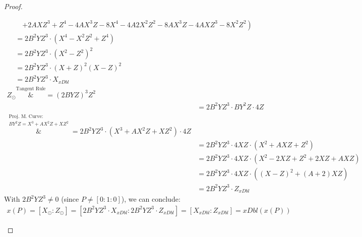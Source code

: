 \begin{proof}
\begin{enumerate}
\begin{align*}
            &\quad\left. + 2AXZ^3 + Z^4 - 4AX^3Z - 8X^4 - 4A2X^2Z^2 - 8AX^3Z - 4AXZ^3 - 8X^2Z^2\right)\\
            &= 2B^2YZ^3\cdot\left(X^4-X^2Z^2+Z^4\right)\\
            &= 2B^2YZ^3\cdot(X^2-Z^2)^2\\
            &= 2B^2YZ^3\cdot(X+Z)^2(X-Z)^2\\
            &= 2B^2YZ^3\cdot X_{xDbl}
        \end{align*}
        \begin{align*}
            Z_\odot \overset{\text{Tangent Rule}}&{=} (2BYZ)^3Z^2\\
            &= 2B^2YZ^3\cdot BY^2Z\cdot 4Z\\
            \overset{\substack{\text{Proj. M. Curve:}\\BY^2Z=X^3+AX^2Z+XZ^2}}&{=} 2B^2YZ^3\cdot (X^3+AX^2Z+XZ^2)\cdot 4Z\\
            &= 2B^2YZ^3\cdot 4XZ\cdot\left(X^2+AXZ + Z^2\right)\\
            &= 2B^2YZ^3\cdot 4XZ\cdot\left(X^2 - 2XZ + Z^2 + 2XZ + AXZ\right)\\
            &= 2B^2YZ^3\cdot 4XZ\cdot\left((X-Z)^2 + (A+2)XZ\right)\\
            &= 2B^2YZ^3\cdot Z_{xDbl}
        \end{align*}
        With $2B^2YZ^3\neq 0$ (since $P\neq[0:1:0]$), we can conclude:
        \begin{align*}
            x(P) = [X_\odot:Z_\odot] = [2B^2YZ^3\cdot X_{xDbl}:2B^2YZ^3\cdot Z_{xDbl}]=[X_{xDbl}:Z_{xDbl}]= xDbl(x(P))
        \end{align*}
    \end{enumerate}
\end{proof}